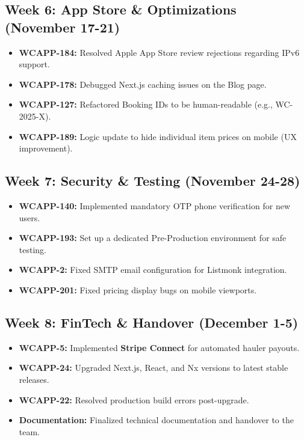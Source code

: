 \subsection{Week 6: App Store \& Optimizations (November 17-21)}
\begin{itemize}
    \item \textbf{WCAPP-184:} Resolved Apple App Store review rejections regarding IPv6 support.
    \item \textbf{WCAPP-178:} Debugged Next.js caching issues on the Blog page.
    \item \textbf{WCAPP-127:} Refactored Booking IDs to be human-readable (e.g., WC-2025-X).
    \item \textbf{WCAPP-189:} Logic update to hide individual item prices on mobile (UX improvement).
\end{itemize}

\subsection{Week 7: Security \& Testing (November 24-28)}
\begin{itemize}
    \item \textbf{WCAPP-140:} Implemented mandatory OTP phone verification for new users.
    \item \textbf{WCAPP-193:} Set up a dedicated Pre-Production environment for safe testing.
    \item \textbf{WCAPP-2:} Fixed SMTP email configuration for Listmonk integration.
    \item \textbf{WCAPP-201:} Fixed pricing display bugs on mobile viewports.
\end{itemize}

\subsection{Week 8: FinTech \& Handover (December 1-5)}
\begin{itemize}
    \item \textbf{WCAPP-5:} Implemented \textbf{Stripe Connect} for automated hauler payouts.
    \item \textbf{WCAPP-24:} Upgraded Next.js, React, and Nx versions to latest stable releases.
    \item \textbf{WCAPP-22:} Resolved production build errors post-upgrade.
    \item \textbf{Documentation:} Finalized technical documentation and handover to the team.
\end{itemize}

